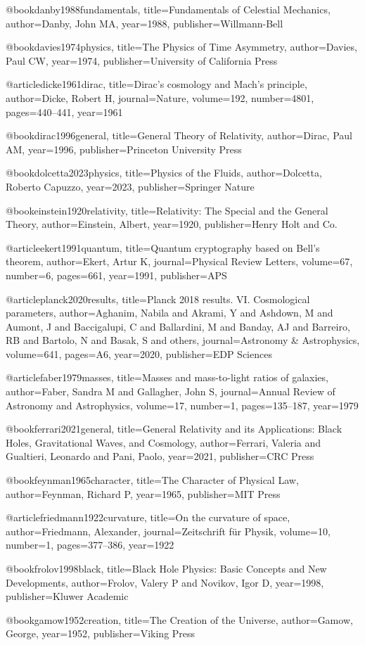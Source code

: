 \documentclass[aps,prresearch,reprint,onecolumn,superscriptaddress,nofootinbib,12pt]{revtex4-2}
\begin{document}
@book{danby1988fundamentals,
  title={Fundamentals of Celestial Mechanics},
  author={Danby, John MA},
  year={1988},
  publisher={Willmann-Bell}
}

@book{davies1974physics,
  title={The Physics of Time Asymmetry},
  author={Davies, Paul CW},
  year={1974},
  publisher={University of California Press}
}

@article{dicke1961dirac,
  title={Dirac's cosmology and Mach's principle},
  author={Dicke, Robert H},
  journal={Nature},
  volume={192},
  number={4801},
  pages={440--441},
  year={1961}
}

@book{dirac1996general,
  title={General Theory of Relativity},
  author={Dirac, Paul AM},
  year={1996},
  publisher={Princeton University Press}
}

@book{dolcetta2023physics,
  title={Physics of the Fluids},
  author={Dolcetta, Roberto Capuzzo},
  year={2023},
  publisher={Springer Nature}
}

@book{einstein1920relativity,
  title={Relativity: The Special and the General Theory},
  author={Einstein, Albert},
  year={1920},
  publisher={Henry Holt and Co.}
}

@article{ekert1991quantum,
  title={Quantum cryptography based on Bell's theorem},
  author={Ekert, Artur K},
  journal={Physical Review Letters},
  volume={67},
  number={6},
  pages={661},
  year={1991},
  publisher={APS}
}

@article{planck2020results,
  title={Planck 2018 results. VI. Cosmological parameters},
  author={Aghanim, Nabila and Akrami, Y and Ashdown, M and Aumont, J and Baccigalupi, C and Ballardini, M and Banday, AJ and Barreiro, RB and Bartolo, N and Basak, S and others},
  journal={Astronomy \& Astrophysics},
  volume={641},
  pages={A6},
  year={2020},
  publisher={EDP Sciences}
}

@article{faber1979masses,
  title={Masses and mass-to-light ratios of galaxies},
  author={Faber, Sandra M and Gallagher, John S},
  journal={Annual Review of Astronomy and Astrophysics},
  volume={17},
  number={1},
  pages={135--187},
  year={1979}
}

@book{ferrari2021general,
  title={General Relativity and its Applications: Black Holes, Gravitational Waves, and Cosmology},
  author={Ferrari, Valeria and Gualtieri, Leonardo and Pani, Paolo},
  year={2021},
  publisher={CRC Press}
}

@book{feynman1965character,
  title={The Character of Physical Law},
  author={Feynman, Richard P},
  year={1965},
  publisher={MIT Press}
}

@article{friedmann1922curvature,
  title={On the curvature of space},
  author={Friedmann, Alexander},
  journal={Zeitschrift f{\"u}r Physik},
  volume={10},
  number={1},
  pages={377--386},
  year={1922}
}

@book{frolov1998black,
  title={Black Hole Physics: Basic Concepts and New Developments},
  author={Frolov, Valery P and Novikov, Igor D},
  year={1998},
  publisher={Kluwer Academic}
}

@book{gamow1952creation,
  title={The Creation of the Universe},
  author={Gamow, George},
  year={1952},
  publisher={Viking Press}
}
\end{document}
